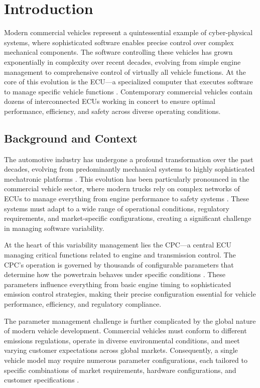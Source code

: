 \chapter{Introduction}
\label{chap:introduction}

Modern commercial vehicles represent a quintessential example of cyber-physical systems, where sophisticated software enables precise control over complex mechanical components. The software controlling these vehicles has grown exponentially in complexity over recent decades, evolving from simple engine management to comprehensive control of virtually all vehicle functions. At the core of this evolution is the \ac{ECU}—a specialized computer that executes software to manage specific vehicle functions \cite{broy2006challenges}. Contemporary commercial vehicles contain dozens of interconnected \acp{ECU} working in concert to ensure optimal performance, efficiency, and safety across diverse operating conditions.

\section{Background and Context}
\label{sec:background}

The automotive industry has undergone a profound transformation over the past decades, evolving from predominantly mechanical systems to highly sophisticated mechatronic platforms \cite{pretschner2007software}. This evolution has been particularly pronounced in the commercial vehicle sector, where modern trucks rely on complex networks of \acp{ECU} to manage everything from engine performance to safety systems \cite{broy2006challenges}. These systems must adapt to a wide range of operational conditions, regulatory requirements, and market-specific configurations, creating a significant challenge in managing software variability.

At the heart of this variability management lies the \ac{CPC}—a central \ac{ECU} managing critical functions related to engine and transmission control. The \ac{CPC}'s operation is governed by thousands of configurable parameters that determine how the powertrain behaves under specific conditions \cite{staron2021automotive}. These parameters influence everything from basic engine timing to sophisticated emission control strategies, making their precise configuration essential for vehicle performance, efficiency, and regulatory compliance.

The parameter management challenge is further complicated by the global nature of modern vehicle development. Commercial vehicles must conform to different emissions regulations, operate in diverse environmental conditions, and meet varying customer expectations across global markets. Consequently, a single vehicle model may require numerous parameter configurations, each tailored to specific combinations of market requirements, hardware configurations, and customer specifications \cite{trovao2024evolution}.

